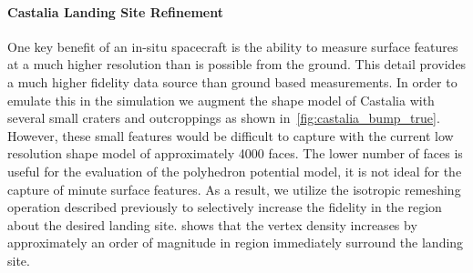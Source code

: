 \paragraph{Castalia Landing Site Refinement}
One key benefit of an in-situ spacecraft is the ability to measure surface features at a much higher resolution than is possible from the ground. 
This detail provides a much higher fidelity data source than ground based measurements. 
In order to emulate this in the simulation we augment the shape model of Castalia with several small craters and outcroppings as shown in~\cref{fig:castalia_bump_true}.
However, these small features would be difficult to capture with the current low resolution shape model of approximately \num{4000} faces.
The lower number of faces is useful for the evaluation of the polyhedron potential model, it is not ideal for the capture of minute surface features. 
As a result, we utilize the isotropic remeshing operation described previously to selectively increase the fidelity in the region about the desired landing site.
 shows that the vertex density increases by approximately an order of magnitude in region immediately surround the landing site.
